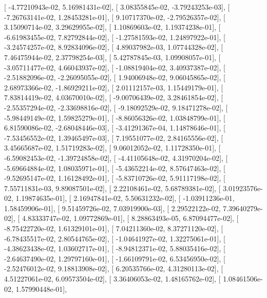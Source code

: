 \documentclass{article}
\begin{document}
       [ -4.77210943e-02,   5.16981431e-02],
       [  3.08355845e-02,  -3.79243253e-03],
       [ -7.26763141e-02,   1.28453281e-01],
       [  9.10717370e-02,  -2.79526357e-02],
       [  3.15090714e-02,   3.29629955e-02],
       [  1.10869603e-02,   1.19374238e-01],
       [ -6.61983455e-02,   7.82792844e-02],
       [ -1.27581593e-02,   1.24897922e-01],
       [ -3.24574257e-02,   8.92834096e-02],
       [  4.89037982e-03,   1.07744328e-02],
       [  7.46475944e-02,   2.37798254e-03],
       [  5.42787845e-03,   1.09908057e-01],
       [ -3.05711477e-02,   4.66043937e-02],
       [ -1.08819404e-02,   3.40937387e-02],
       [ -2.51882096e-02,  -2.26095055e-02],
       [  1.94006948e-02,   9.06045865e-02],
       [  2.68973366e-02,  -1.86929211e-02],
       [  2.01112157e-03,   1.15449179e-01],
       [  7.83814419e-02,   4.03670010e-02],
       [ -9.00706439e-02,   3.28461854e-02],
       [ -2.55357294e-02,  -2.33698816e-02],
       [ -9.18092529e-02,   9.18471278e-02],
       [ -5.98449149e-02,   1.59825279e-01],
       [ -8.86056326e-02,   1.03848799e-01],
       [  6.81590086e-02,  -2.68048446e-03],
       [ -3.41291367e-04,   1.14878646e-01],
       [ -7.53456552e-02,   1.39465497e-03],
       [  7.19551077e-02,   2.84165556e-02],
       [  3.45665687e-02,   1.51719283e-02],
       [  9.06012052e-02,   1.11728350e-01],
       [ -6.59082453e-02,  -1.39724858e-02],
       [ -4.41105648e-02,   4.31970204e-02],
       [ -5.69664884e-02,   1.08035971e-01],
       [ -5.43652214e-02,   8.57647463e-02],
       [ -9.52695147e-02,   1.16128492e-01],
       [ -5.83710726e-02,   5.91117198e-02],
       [  7.55711831e-03,   9.89087501e-02],
       [  2.22108461e-02,   5.68789381e-02],
       [  3.01923576e-02,   1.19874635e-01],
       [  2.16947841e-02,   5.50631232e-02],
       [ -1.03911236e-01,   1.58459906e-01],
       [  9.51459726e-02,   7.03919900e-03],
       [  2.29522122e-02,   7.39640279e-02],
       [  4.83333747e-02,   1.09772869e-01],
       [  8.28863493e-05,   6.87094477e-02],
       [ -8.75422720e-02,   1.61329101e-01],
       [  7.04211360e-02,   8.37271120e-02],
       [ -6.78435517e-02,   2.80544765e-02],
       [ -1.04641927e-02,   1.32275061e-01],
       [ -4.38623438e-02,   1.03602717e-01],
       [ -8.94812371e-02,   5.88035416e-02],
       [ -2.64637490e-02,   1.29797160e-01],
       [ -1.66109791e-02,   6.53456950e-02],
       [ -2.52476012e-02,   9.18813908e-02],
       [  6.20535766e-02,   4.31280113e-02],
       [  4.51227061e-02,   6.09573504e-02],
       [  3.36406053e-02,   1.48165762e-02],
       [  1.08461506e-02,   1.57990448e-01],
\end{document}
